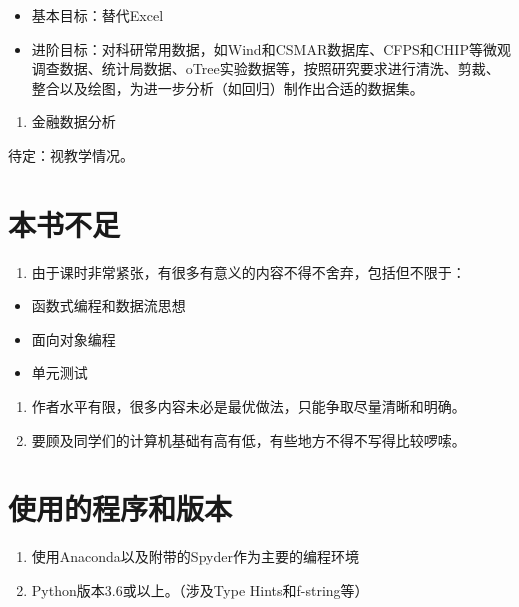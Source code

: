 \documentclass[
]{book}
\providecommand{\tightlist}{%
  \setlength{\itemsep}{0pt}\setlength{\parskip}{0pt}}
\begin{document}
\begin{itemize}
\tightlist
\item
  基本目标：替代Excel
\item
  进阶目标：对科研常用数据，如Wind和CSMAR数据库、CFPS和CHIP等微观调查数据、统计局数据、oTree实验数据等，按照研究要求进行清洗、剪裁、整合以及绘图，为进一步分析（如回归）制作出合适的数据集。
\end{itemize}

\begin{enumerate}
\def\labelenumi{\arabic{enumi}.}
\setcounter{enumi}{2}
\tightlist
\item
  金融数据分析
\end{enumerate}

待定：视教学情况。

\hypertarget{ux672cux4e66ux4e0dux8db3}{%
\section{本书不足}\label{ux672cux4e66ux4e0dux8db3}}

\begin{enumerate}
\def\labelenumi{\arabic{enumi}.}
\tightlist
\item
  由于课时非常紧张，有很多有意义的内容不得不舍弃，包括但不限于：
\end{enumerate}

\begin{itemize}
\tightlist
\item
  函数式编程和数据流思想
\item
  面向对象编程
\item
  单元测试
\end{itemize}

\begin{enumerate}
\def\labelenumi{\arabic{enumi}.}
\setcounter{enumi}{1}
\tightlist
\item
  作者水平有限，很多内容未必是最优做法，只能争取尽量清晰和明确。
\item
  要顾及同学们的计算机基础有高有低，有些地方不得不写得比较啰嗦。
\end{enumerate}

\hypertarget{ux4f7fux7528ux7684ux7a0bux5e8fux548cux7248ux672c}{%
\section{使用的程序和版本}\label{ux4f7fux7528ux7684ux7a0bux5e8fux548cux7248ux672c}}

\begin{enumerate}
\def\labelenumi{\arabic{enumi}.}
\tightlist
\item
  使用Anaconda以及附带的Spyder作为主要的编程环境
\item
  Python版本3.6或以上。（涉及Type Hints和f-string等）
\end{enumerate}
\end{document}
